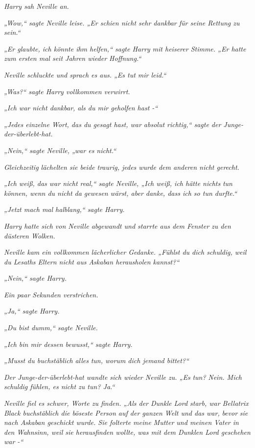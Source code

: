 {\emph{Harry sah Neville an.}

\emph{„Wow,“ sagte Neville leise. „Er schien nicht sehr dankbar für seine Rettung zu sein.“}

\emph{„Er glaubte, ich könnte ihm helfen,“ sagte Harry mit heiserer Stimme. „Er hatte zum ersten mal seit Jahren wieder Hoffnung.“}

\emph{Neville schluckte und sprach es aus. „Es tut mir leid.“}

\emph{„Was?“ sagte Harry vollkommen verwirrt.}

\emph{„Ich war nicht dankbar, als du mir geholfen hast -“}

\emph{„Jedes einzelne Wort, das du gesagt hast, war absolut richtig,“ sagte der Junge-der-überlebt-hat.}

\emph{„Nein,“ sagte Neville, „war es nicht.“}

\emph{Gleichzeitig lächelten sie beide traurig, jedes wurde dem anderen nicht gerecht.}

\emph{„Ich weiß, das war nicht real,“ sagte Neville, „Ich weiß, ich hätte nichts} \emph{tun können, wenn du nicht da gewesen wärst, aber danke, dass ich so tun durfte.“}

\emph{„Jetzt mach mal halblang,“ sagte Harry.}

\emph{Harry hatte sich von Neville abgewandt und starrte aus dem Fenster zu den düsteren Wolken.}

\emph{Neville kam ein vollkommen lächerlicher Gedanke. „Fühlst du dich schuldig, weil du Lesaths Eltern nicht aus Askaban herausholen kannst?“}

\emph{„Nein,“ sagte Harry.}

\emph{Ein paar Sekunden verstrichen.}

\emph{„Ja,“ sagte Harry.}

\emph{„Du bist dumm,“ sagte Neville.}

\emph{„Ich bin mir dessen bewusst,“ sagte Harry.}

\emph{„Musst du buchstäblich} \emph{\emph{alles}} \emph{tun, worum dich jemand bittet?“}

\emph{Der Junge-der-überlebt-hat wandte sich wieder Neville zu. „Es} \emph{\emph{tun?}} \emph{Nein. Mich schuldig fühlen, es nicht zu tun? Ja.“}

\emph{Neville fiel es schwer, Worte zu finden. „Als der Dunkle Lord starb, war Bellatrix Black buchstäblich die böseste Person auf der ganzen Welt und das war,} \emph{\emph{bevor}} \emph{sie nach Askaban geschickt wurde. Sie folterte meine Mutter und meinen Vater in den Wahnsinn, weil sie herausfinden wollte, was mit dem Dunklen Lord geschehen war -“}

}
